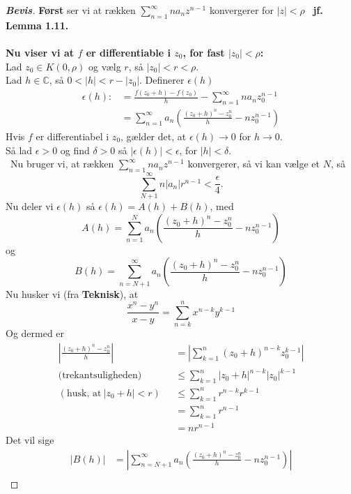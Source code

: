 \documentclass[10pt,a4paper]{article}
\theoremstyle{definition}
\begin{document}
\newpage
\begin{proof}[\textbf{Bevis}]
\textbf{Først} ser vi at rækken $\sum\limits_{n=1}^\infty n a_n z^{n-1}$ konvergerer for $\left| z \right| < \rho$  \ \textbf{jf. Lemma 1.11.} \\ \\

\textbf{Nu viser vi at $f$ er differentiable i $z_0$, for fast $ \left| z_0 \right| < \rho$:} \\
Lad $z_0 \in K(0, \rho)$ og vælg $r$, så $\left| z_0 \right| < r < \rho $. \\
Lad $h \in \mathbb{C}$, så $0 < \left| h \right| < r - \left| z_0 \right|$. Definerer $\epsilon (h)$
\begin{align*}
\epsilon(h):&= \frac{f(z_0 + h) - f(z_0)}{h} - \sum\limits_{n=1}^\infty n a_n z_0^{n-1} \\
&= \sum\limits_{n=1}^\infty a_n ( \frac{(z_0 + h)^n - z_0^n}{h} - n z_0^{n-1})
\end{align*}
Hvis $f$ er differentiabel i $z_0$, gælder det, at $\epsilon (h) \rightarrow 0$ for $h \rightarrow 0$.\\
Så lad $\epsilon > 0$ og find $\delta > 0$ så $\left| \epsilon (h) \right| < \epsilon$, for  $\left|  h \right| < \delta$. \\
\ Nu bruger vi, at rækken $\sum\limits_{n=1}^\infty n a_n z^{n-1}$ konvergerer, så vi kan vælge et $N$, så
$$\sum\limits_{N + 1}^\infty n \left| a_n \right| r^{n-1} < \frac{\epsilon}{4}.$$
Nu deler vi $\epsilon (h)$ så $\epsilon (h) = A(h) + B(h)$, med
$$ A(h) = \sum\limits_{n=1}^N a_n ( \frac{(z_0 + h)^n - z_0^n}{h} - n z_0^{n-1}) $$
og
$$B(h) = \sum\limits_{n=N+1}^\infty a_n (\frac{(z_0 + h)^n - z_0^n}{h} - n z_0^{n-1}) $$
Nu husker vi (fra \textbf{Teknisk}), at
$$ \frac{x^n - y^n}{x-y} = \sum\limits_{n=k}^n x^{n-k} y^{k-1}$$
Og dermed er
\begin{align*}
\left| \frac{(z_0 + h)^n - z_0^n}{h} \right| &= \left| \sum\limits_{k=1}^n (z_0 + h)^{n-k} z_0^{k-1} \right| \\
\text{(trekantsuligheden)} \ \ \ &\leq \sum\limits_{k=1}^n \left| z_0 + h \right|^{n-k} \left| z_0 \right| ^{k-1} \\
(\text{husk, at} \ \left| z_0 + h \right| < r) \ \ \ &\leq \sum\limits_{k=1}^n r^{n-k} r ^{k-1} \\
&= \sum\limits_{k=1}^n r^{n-1} \\
&= nr^{n-1}
\end{align*}
Det vil sige
\begin{align*}
\left| B(h) \right| &= \left| \sum\limits_{n=N+1}^\infty a_n ( \frac{(z_0 + h)^n - z_0^n}{h} - n z_0^{n-1}) \right| \\

\end{align*}
\end{proof}
\end{document}
